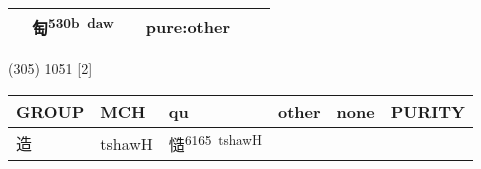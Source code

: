 \documentclass[14pt,a4paper]{scrartcl}
\begin{document}
\begin{longtable}[c]{@{}llllll@{}}
\begin{minipage}[t]{0.14\columnwidth}\raggedright\strut
\strut\end{minipage} &
\begin{minipage}[t]{0.14\columnwidth}\raggedright\strut
匋\textsuperscript{530b~daw}
\strut\end{minipage} &
\begin{minipage}[t]{0.14\columnwidth}\raggedright\strut
\strut\end{minipage} &
\begin{minipage}[t]{0.14\columnwidth}\raggedright\strut
pure:other
\strut\end{minipage}\tabularnewline
\bottomrule
\end{longtable}

(305) 1051 {[}2{]}

\begin{longtable}[c]{@{}llllll@{}}
\toprule
\begin{minipage}[b]{0.14\columnwidth}\raggedright\strut
GROUP
\strut\end{minipage} &
\begin{minipage}[b]{0.14\columnwidth}\raggedright\strut
MCH
\strut\end{minipage} &
\begin{minipage}[b]{0.14\columnwidth}\raggedright\strut
qu
\strut\end{minipage} &
\begin{minipage}[b]{0.14\columnwidth}\raggedright\strut
other
\strut\end{minipage} &
\begin{minipage}[b]{0.14\columnwidth}\raggedright\strut
none
\strut\end{minipage} &
\begin{minipage}[b]{0.14\columnwidth}\raggedright\strut
PURITY
\strut\end{minipage}\tabularnewline
\midrule
\endhead
\begin{minipage}[t]{0.14\columnwidth}\raggedright\strut
造
\strut\end{minipage} &
\begin{minipage}[t]{0.14\columnwidth}\raggedright\strut
tshawH
\strut\end{minipage} &
\begin{minipage}[t]{0.14\columnwidth}\raggedright\strut
慥\textsuperscript{6165~tshawH}
\strut\end{minipage} &
\begin{minipage}[t]{0.14\columnwidth}\raggedright\strut
\strut\end{minipage} &

\end{longtable}
\end{document}
